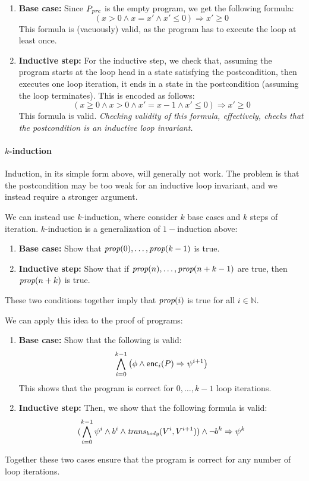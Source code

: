 \documentclass{amsart}
\theoremstyle{definition}
\theoremstyle{remark}
\numberwithin{equation}{section}
\begin{document}
\begin{enumerate}
  \item \textbf{Base case:}
  Since $P_{\emph{pre}}$ is the empty program, we get the following
  formula:
  $$(x>0 \land x = x' \land x' \leq 0) \Rightarrow x' \geq 0$$
  This formula is (vacuously) valid,
  as the program has to execute the loop at least once.

  \item \textbf{Inductive step:}
  For the inductive step, we check that,
  assuming the program starts at the loop head
  in a state satisfying the postcondition,
  then executes one loop iteration,
  it ends in a state in the postcondition (assuming the loop terminates).
  This is encoded as follows:
  $$(x \geq 0 \land x > 0 \land x' = x - 1 \land x' \leq 0) \Rightarrow x' \geq 0$$
  This formula is valid.
  \emph{Checking validity of this formula, effectively, checks that
  the postcondition is an inductive loop invariant.}
\end{enumerate}

\paragraph{$k$-induction}
%
Induction, in its simple form above, will generally
not work.
The problem is that the postcondition may be too weak
for an inductive loop invariant, and we instead
require a stronger argument.

We can instead use $k$-induction, where consider
$k$ base cases and $k$ steps of iteration.
$k$-induction is a generalization of $1-$induction
above:

\begin{enumerate}
  \item \textbf{Base case:}
  Show that $\emph{prop}(0),\ldots,\emph{prop}(k-1)$ is true.

  \item \textbf{Inductive step:}
  Show that if $\emph{prop}(n),\ldots,\emph{prop}(n+k-1)$
  are true, then $\emph{prop}(n+k)$ is true.
\end{enumerate}
These two conditions together imply that
$\emph{prop}(i)$ is true for all $i \in \mathbb{N}$.

We can apply this idea to the proof of programs:

\begin{enumerate}
  \item \textbf{Base case:}
  Show that the following is valid:
  \begin{align*}
    \bigwedge_{i=0}^{k-1} \left(\phi \land \mathsf{enc}_i(P) \Rightarrow \psi^{i+1}\right)
  \end{align*}
  This shows that the program is correct for $0,\ldots,k-1$
  loop iterations.

  \item \textbf{Inductive step:}
  Then, we show that the following formula is valid:
  \begin{align*}
    (\bigwedge_{i=0}^{k-1}
    \psi^{i} \land b^i \land  \mathit{trans}_{\emph{body}}(V^i,V^{i+1}))
    \land \neg b^{k} \Rightarrow \psi^k
  \end{align*}
\end{enumerate}
Together these two cases ensure that the program
is correct for any number of loop iterations.
\end{document}
